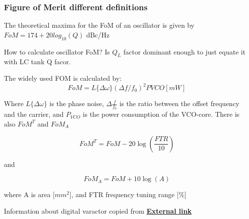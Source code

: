 \documentclass{article}
\begin{document}
\subsubsection{Figure of Merit different definitions}

\begin{info} %
	The theoretical maxima for the FoM of an oscillator is given by $FoM=174+20log_{10}(Q)$ dBc/Hz
\end{info}

How to calculate oscillator FoM? Is $Q_L$ factor dominant enough to just equate it with LC tank Q facor.

The widely used FOM is calculated by:
\begin{equation}
	FoM = L\{ \Delta \omega \}( \Delta f/f_0)^2 PVCO [mW]
\end{equation}

Where $L\{\Delta \omega\}$ is the phase noise, $ \Delta \frac{f}{f_0}$ is the ratio between the offset frequency and the carrier, and $P_{VCO}$ is the power consumption of the VCO-core. There is also $FoM^T$ and $FoM_A$ 

\begin{equation}
	FoM^T = FoM - 20 \log (\dfrac{FTR}{10})
\end{equation}

and 

\begin{equation}
	FoM_A = FoM + 10 \log (A)
\end{equation}

where A is area [$mm^2$], and FTR frequency tuning range [$\%$]

Information about digital varactor copied from \href{https://www.doe.carleton.ca/~ddchen/Tutorials/DCO.pdf}{\textbf{External link}}
\end{document}
